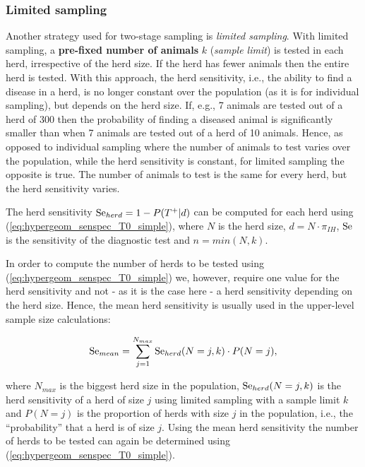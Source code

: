 \documentclass[nojss]{jss}
\begin{document}

\subsubsection{Limited sampling}
\label{subsubsec:ltd-sampling}

Another strategy used for two-stage sampling is \emph{limited sampling}. With limited sampling, a \textbf{pre-fixed number of animals} $k$ (\emph{sample limit})  is tested in each herd, irrespective of the herd size. If the herd has fewer animals then the entire herd is tested. With this approach, the   herd sensitivity, i.e., the ability to find a disease in a herd, is no longer constant over the population (as it is for individual sampling), but depends on the herd size. If, e.g., 7 animals are tested out of a herd of 300 then the probability of finding a diseased animal is significantly smaller than when 7 animals are tested out of a herd of 10 animals. Hence, as opposed to individual sampling where the number of animals to test varies over the population, while the herd sensitivity is constant, for limited sampling the opposite is true. The number of animals to test is the same for every herd, but the herd sensitivity varies.

The herd sensitivity $\mbox{Se}_{herd} = 1 - P(T^+|d)$ can be computed for each herd using (\ref{eq:hypergeom_senspec_T0_simple}), where $N$ is the herd size, $d=N\cdot \pi_{IH}$, $\mbox{Se}$ is the sensitivity of the diagnostic test   and $n=min(N,k)$.

In order to compute the number of herds to be tested using (\ref{eq:hypergeom_senspec_T0_simple}) we, however, require one value for the herd sensitivity and not - as it is the case here - a herd sensitivity depending on the herd size. Hence, the mean herd sensitivity is usually used in the upper-level sample size calculations:

\begin{equation}
%
\Se_{mean} = \sum_{j = 1}^{N_{max}} \Se_{herd}(N=j,k)\cdot P(N=j),
%
\end{equation}

where $N_{max}$ is the biggest herd size in the population, $\mbox{Se}_{herd}(N=j,k)$ is the herd sensitivity of a herd of size $j$ using limited sampling with a sample limit $k$ and $P(N=j)$ is the proportion of herds with size $j$ in the population, i.e., the ``probability'' that a herd is of size $j$. Using the mean herd sensitivity the number of herds to be tested can again be determined using (\ref{eq:hypergeom_senspec_T0_simple}).
\end{document}
